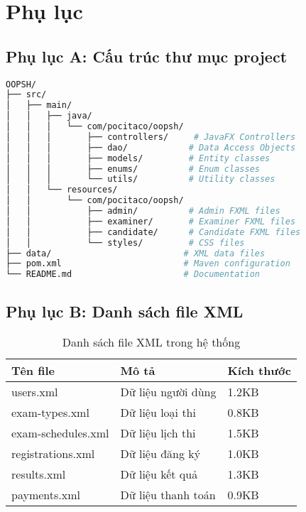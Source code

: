 \documentclass[12pt,a4paper]{article}
\begin{document}
\section{Phụ lục}

\subsection{Phụ lục A: Cấu trúc thư mục project}

\begin{lstlisting}[language=bash, caption=Cấu trúc thư mục]
OOPSH/
├── src/
│   ├── main/
│   │   ├── java/
│   │   │   └── com/pocitaco/oopsh/
│   │   │       ├── controllers/     # JavaFX Controllers
│   │   │       ├── dao/            # Data Access Objects
│   │   │       ├── models/         # Entity classes
│   │   │       ├── enums/          # Enum classes
│   │   │       └── utils/          # Utility classes
│   │   └── resources/
│   │       └── com/pocitaco/oopsh/
│   │           ├── admin/          # Admin FXML files
│   │           ├── examiner/       # Examiner FXML files
│   │           ├── candidate/      # Candidate FXML files
│   │           └── styles/         # CSS files
├── data/                          # XML data files
├── pom.xml                        # Maven configuration
└── README.md                      # Documentation
\end{lstlisting}

\subsection{Phụ lục B: Danh sách file XML}

\begin{table}[H]
\centering
\begin{tabular}{|l|l|l|}
\hline
\textbf{Tên file} & \textbf{Mô tả} & \textbf{Kích thước} \\
\hline
users.xml & Dữ liệu người dùng & 1.2KB \\
\hline
exam-types.xml & Dữ liệu loại thi & 0.8KB \\
\hline
exam-schedules.xml & Dữ liệu lịch thi & 1.5KB \\
\hline
registrations.xml & Dữ liệu đăng ký & 1.0KB \\
\hline
results.xml & Dữ liệu kết quả & 1.3KB \\
\hline
payments.xml & Dữ liệu thanh toán & 0.9KB \\
\hline
\end{tabular}
\caption{Danh sách file XML trong hệ thống}
\label{tab:xml_files}
\end{table}
\end{document}
